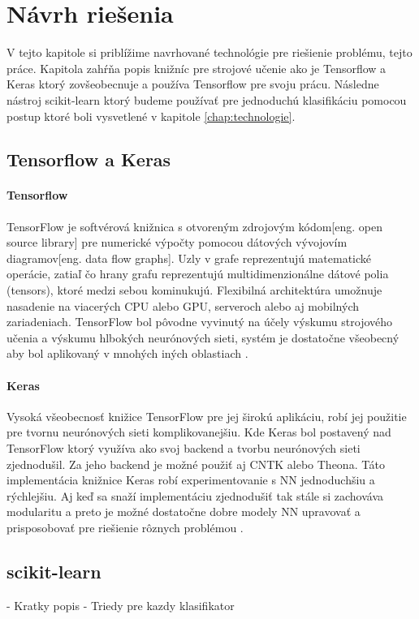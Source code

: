 \chapter{Návrh riešenia}

V tejto kapitole si priblížime navrhované technológie pre riešienie problému, tejto práce.
Kapitola zahŕňa popis knižníc pre strojové učenie ako je Tensorflow a Keras ktorý zovšeobecnuje a používa Tensorflow pre svoju prácu.
Následne nástroj scikit-learn ktorý budeme používať pre jednoduchú klasifikáciu pomocou postup ktoré boli vysvetlené v kapitole \ref{chap:technologie}.

\section{Tensorflow a Keras}

\subsubsection{Tensorflow}
TensorFlow je softvérová knižnica s otvoreným zdrojovým kódom[eng. open source library] pre numerické výpočty pomocou dátových vývojovím diagramov[eng. data flow graphs].
Uzly v grafe reprezentujú matematické operácie, zatiaľ čo hrany grafu reprezentujú multidimenzionálne dátové polia (tensors), ktoré medzi sebou kominukujú.
Flexibilná architektúra umožnuje nasadenie na viacerých CPU alebo GPU, serveroch alebo aj mobilných zariadeniach.
TensorFlow bol pôvodne vyvinutý na účely výskumu strojového učenia a výskumu hlbokých neurónových sieti, systém je dostatočne všeobecný aby bol aplikovaný v mnohých iných oblastiach \cite{odkaz:TensorFlow}.

\subsubsection{Keras}
Vysoká všeobecnosť knižice TensorFlow pre jej širokú aplikáciu, robí jej použitie pre tvornu neurónových sieti komplikovanejšiu.
Kde Keras bol postavený nad TensorFlow ktorý využíva ako svoj backend a tvorbu neurónových sieti zjednodušil.
Za jeho backend je možné použiť aj CNTK alebo Theona.
Táto implementácia knižnice Keras robí experimentovanie s NN jednoduchšiu a rýchlejšiu.
Aj keď sa snaží implementáciu zjednodušiť tak stále si zachováva modularitu a preto je možné dostatočne dobre modely NN upravovať a prisposobovať pre riešienie rôznych problémou \cite{odkaz:Keras}.

\section{scikit-learn}
- Kratky popis
- Triedy pre kazdy klasifikator

